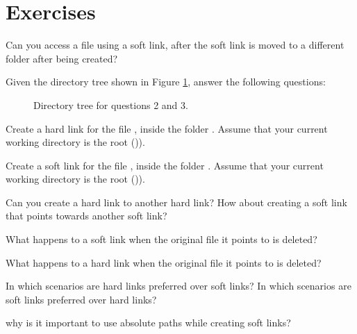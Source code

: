 \section*{Exercises}


\begin{exercises}
  \item Can you access a file using a soft link, after the soft link is moved to a different folder after being created?

Given the directory tree shown in Figure \ref{fig:ch7_ex_dirtree}, answer the following questions:
\begin{figure}[!htbp]
  \centering
        
        \caption{Directory tree for questions 2 and 3.}
        \label{fig:ch7_ex_dirtree}
\end{figure}
  \item Create a hard link for the file , inside the folder . Assume that your current working directory is the root ()\mycommand{/}).
  \item Create a soft link for the file , inside the folder . Assume that your current working directory is the root ()\mycommand{/}).
  \item Can you create a hard link to another hard link? How about creating a soft link that points towards another soft link?
  \item What happens to a soft link when the original file it points to is deleted?
  \item What happens to a hard link when the original file it points to is deleted?
  \item In which scenarios are hard links preferred over soft links? In which scenarios are soft links preferred over hard links?
  \item why is it important to use absolute paths while creating soft links?
\end{exercises}
